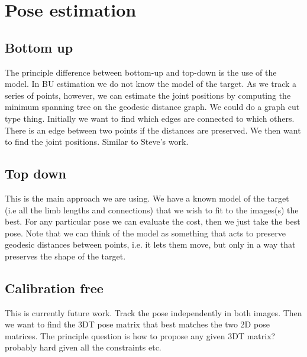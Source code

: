 \section{Pose estimation}

\subsection{Bottom up}

The principle difference between bottom-up and top-down is the use of the model. In BU estimation we do not know the model of the target. As we track a series of points, however, we can estimate the joint positions by computing the minimum spanning tree on the geodesic distance graph. We could do a graph cut type thing. Initially we want to find which edges are connected to which others. There is an edge between two points if the distances are preserved. We then want to find the joint positions. Similar to Steve's work.

\subsection{Top down}

This is the main approach we are using. We have a known model of the target (i.e all the limb lengths and connections) that we wish to fit to the images(s) the best. For any particular pose we can evaluate the cost, then we just take the best pose. Note that we can think of the model as something that acts to preserve geodesic distances between points, i.e. it lets them move, but only in a way that preserves the shape of the target. 

\subsection{Calibration free}

This is currently future work. Track the pose independently in both images. Then we want to find the 3DT pose matrix that best matches the two 2D pose matrices. The principle question is how to propose any given 3DT matrix? probably hard given all the constraints etc. 